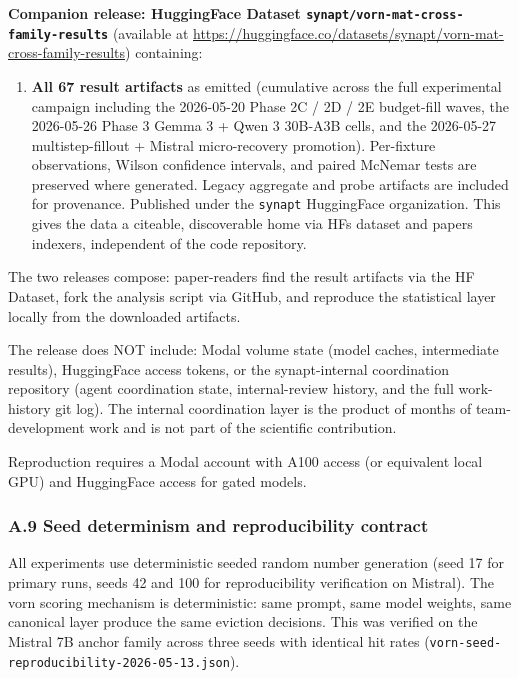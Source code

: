 \documentclass[
]{article}
\providecommand{\tightlist}{%
  \setlength{\itemsep}{0pt}\setlength{\parskip}{0pt}}
\begin{document}
\textbf{Companion release: HuggingFace Dataset
\texttt{synapt/\allowbreak{}vorn-mat-cross-family-results}} (available at
\href{https://huggingface.co/datasets/synapt/vorn-mat-cross-family-results}{\url{https://huggingface.co/datasets/synapt/vorn-mat-cross-family-results}})
containing:

\begin{enumerate}
\def\labelenumi{\arabic{enumi}.}
\setcounter{enumi}{3}
\tightlist
\item
  \textbf{All 67 result artifacts} as emitted (cumulative across the
  full experimental campaign including the 2026-05-20 Phase 2C / 2D /
  2E budget-fill waves, the 2026-05-26 Phase 3 Gemma 3 + Qwen 3 30B-A3B
  cells, and the 2026-05-27 multistep-fillout + Mistral micro-recovery
  promotion). Per-fixture observations, Wilson
  confidence intervals, and paired McNemar tests are preserved where
  generated. Legacy aggregate and probe artifacts are included for
  provenance. Published under the \texttt{synapt} HuggingFace
  organization. This gives the data a citeable, discoverable home via
  HF\textquotesingle s dataset and papers indexers, independent of the
  code repository.
\end{enumerate}

The two releases compose: paper-readers find the result artifacts via
the HF Dataset, fork the analysis script via GitHub, and reproduce the
statistical layer locally from the downloaded artifacts.

The release does NOT include: Modal volume state (model caches,
intermediate results), HuggingFace access tokens, or the synapt-internal
coordination repository (agent coordination state, internal-review
history, and the full work-history git log). The internal coordination
layer is the product of months of team-development work and is not part
of the scientific contribution.

Reproduction requires a Modal account with A100 access (or equivalent
local GPU) and HuggingFace access for gated models.

\subsubsection{A.9 Seed determinism and reproducibility
contract}\label{a9-seed-determinism-and-reproducibility-contract}

All experiments use deterministic seeded random number generation (seed
17 for primary runs, seeds 42 and 100 for reproducibility verification
on Mistral). The vorn scoring mechanism is deterministic: same prompt,
same model weights, same canonical layer produce the same eviction
decisions. This was verified on the Mistral 7B anchor family across
three seeds with identical hit rates
(\texttt{vorn-seed-reproducibility-2026-05-13.\allowbreak{}json}).
\end{document}
